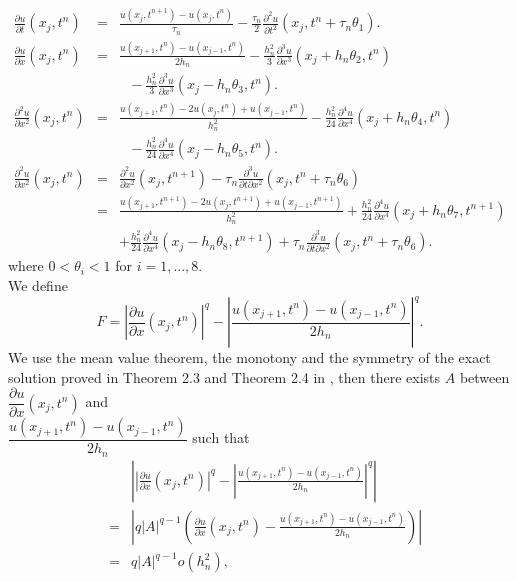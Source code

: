 \documentclass[a4paper,12pt,english,reqno]{smfart}
\begin{document}
	
	\begin{eqnarray}
		\frac{\partial u}{\partial t}(x_{j},t^{n})&=&\frac{u(x_{j},t^{n+1})-u(x_{j},t^{n})}{\tau_{n}}-\frac{\tau_{n}}{2}\frac{\partial^{2} u}{\partial t^{2}}(x_{j},t^{n}+\tau_{n}\theta_{1}).
		\label{etoi}\\
	\frac{\partial u}{\partial x}(x_{j},t^{n})&=&\frac{u(x_{j+1},t^{n})-u(x_{j-1},t^{n})}{2h_{n}}-\frac{h_{n}^{2}}{3}\frac{\partial^{3} u}{\partial x^{3}}(x_{j}+h_{n}\theta_{2},t^{n})\nonumber \\
	&&\ \ \ -\frac{h_{n}^{2}}{3}\frac{\partial^{3} u}{\partial x^{3}}(x_{j}-h_{n}\theta_{3},t^{n}).
	\label{E}\\
	\frac{\partial^{2} u}{\partial x^{2}}(x_{j},t^{n})&=&\frac{u(x_{j+1},t^{n})-2u(x_{j},t^{n})+u(x_{j-1},t^{n})}{h_{n}^{2}}-\frac{h_{n}^{2}}{24}\frac{\partial^{4} u}{\partial x^{4}}(x_{j}+h_{n}\theta_{4},t^{n}) \nonumber \\
	&&\ \ \ -\frac{h_{n}^{2}}{24}\frac{\partial^{4} u}{\partial x^{4}}(x_{j}-h_{n}\theta_{5},t^{n}).\nonumber \\
	\nonumber \frac{\partial^{2} u}{\partial x^{2}}(x_{j},t^{n})&=&\frac{\partial^{2} u}{\partial x^{2}}(x_{j},t^{n+1})-\tau_{n}\frac{\partial^{3} u}{\partial t \partial x^{2}}(x_{j},t^{n}+\tau_{n}\theta_{6})\\
	\nonumber &=&\frac{u(x_{j+1},t^{n+1})-2u(x_{j},t^{n+1})+u(x_{j-1},t^{n+1})}{h_{n}^{2}}+\frac{h_{n}^{2}}{24}\frac{\partial^{4} u}{\partial x^{4}}(x_{j}+h_{n}\theta_{7},t^{n+1})\\
	&&+\frac{h_{n}^{2}}{24}\frac{\partial^{4} u}{\partial x^{4}}(x_{j}-h_{n}\theta_{8},t^{n+1})+\tau_{n}\frac{\partial^{3} u}{\partial t \partial x^{2}}(x_{j},t^{n}+\tau_{n}\theta_{6}).
	\label{et}
	\end{eqnarray}
	\noindent where $0<\theta_{i}<1$ for $i=1,...,8.$\\
	We define
	\begin{equation*}
	F=\left|\frac{\partial u}{\partial x}(x_{j},t^{n})\right|^{q}-\left|\frac{u(x_{j+1},t^{n})-u(x_{j-1},t^{n})}{2h_{n}}\right|^{q}.
	\end{equation*}
	We use the mean value theorem, the monotony and the symmetry of the exact solution proved in Theorem 2.3 and Theorem 2.4 in \cite{hani}, then there exists $A$ between $\dfrac{\partial u}{\partial x}(x_{j},t^{n})$ and\\ $\dfrac{u(x_{j+1},t^{n})-u(x_{j-1},t^{n})}{2h_{n}}$ such that
	\begin{eqnarray*}
		&&\left| \left|\frac{\partial u}{\partial x}(x_{j},t^{n})\right|^{q}-\left|\frac{u(x_{j+1},t^{n})-u(x_{j-1},t^{n})}{2h_{n}}\right|^{q}\right| \\
		&=&\left| q\left|A\right|^{q-1}\left(\frac{\partial u}{\partial x}(x_{j},t^{n})-\frac{u(x_{j+1},t^{n})-u(x_{j-1},t^{n})}{2h_{n}}\right)\right| \\
		&=& q\left|A\right|^{q-1} o(h_{n}^{2}),
	\end{eqnarray*}
\end{document}
